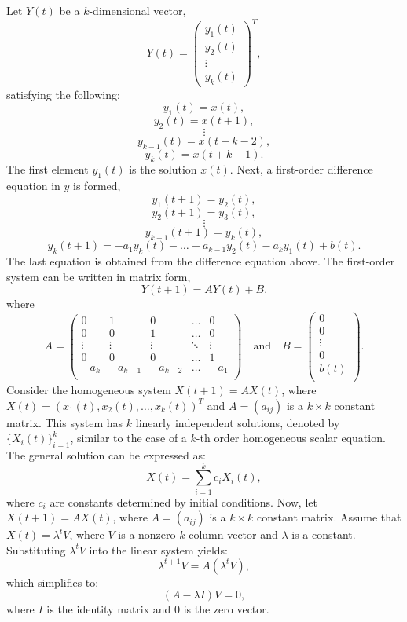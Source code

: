 \documentclass [a4paper]{article}
\begin{document}
Let \(Y(t)\) be a \(k\)-dimensional vector,
\[
Y(t) = {\begin{pmatrix} y_1(t) \\ y_2(t) \\ \vdots \\ y_k(t) \end{pmatrix}}^T,
\]
satisfying the following:
\[
y_1(t) = x(t),
\]
\[
y_2(t) = x(t + 1),
\]
\[
\vdots
\]
\[
y_{k-1}(t) = x(t + k - 2),
\]
\[
y_k(t) = x(t + k - 1).
\]
The first element \(y_1(t)\) is the solution \(x(t)\). Next, a first-order difference equation in \(y\) is formed,
\[
y_1(t + 1) = y_2(t),
\]
\[
y_2(t + 1) = y_3(t),
\]
\[
\vdots
\]
\[
y_{k-1}(t + 1) = y_k(t),
\]
\[
y_k(t + 1) = -a_1 y_{k}(t) - \dots - a_{k-1} y_2(t) - a_k y_1(t) + b(t).
\]
The last equation is obtained from the difference equation above. The first-order system can be written in matrix form,
\[
Y(t + 1) = A Y(t) + B.
\]
where
\[
A = \begin{pmatrix}
0 & 1 & 0 & \dots & 0 \\
0 & 0 & 1 & \dots & 0 \\
\vdots & \vdots & \vdots & \ddots & \vdots \\
0 & 0 & 0 & \dots & 1 \\
-a_k & -a_{k-1} & -a_{k-2} & \dots & -a_1 \\
\end{pmatrix}
\quad \text{and} \quad
B = \begin{pmatrix}
0 \\
0 \\
\vdots \\
0 \\
b(t) \\
\end{pmatrix}.
\]
Consider the homogeneous system \( X(t+1) = AX(t) \), where \( X(t) = (x_1(t), x_2(t), \ldots, x_k(t))^T \) and \( A = (a_{ij}) \) is a \( k \times k \) constant matrix. This system has \( k \) linearly independent solutions, denoted by \( \{X_i(t)\}_{i=1}^k \), similar to the case of a \( k \)-th order homogeneous scalar equation. The general solution can be expressed as:
\[
X(t) = \sum_{i=1}^k c_i X_i(t),
\]
where \( c_i \) are constants determined by initial conditions.
Now, let \( X(t+1) = AX(t) \), where \( A = (a_{ij}) \) is a \( k \times k \) constant matrix. Assume that \( X(t) = \lambda^t V \), where \( V \) is a nonzero \( k \)-column vector and \( \lambda \) is a constant. Substituting \( \lambda^t V \) into the linear system yields:
\[
\lambda^{t+1} V = A(\lambda^t V),
\]
which simplifies to:
\[
(A - \lambda I)V = 0,
\]
where \( I \) is the identity matrix and \( 0 \) is the zero vector. 
\end{document}
